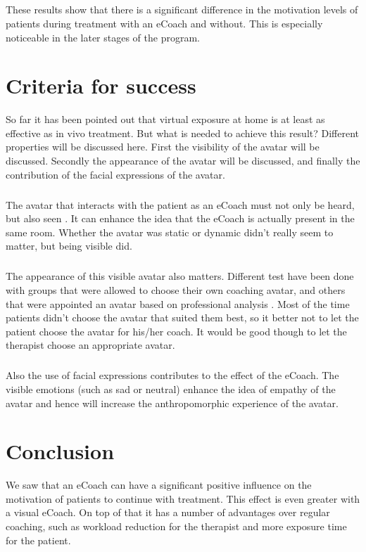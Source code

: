\documentclass[english,a4paper,pdftex]{report}
\begin{document}
\paragraph{}
These results show that there is a significant difference in the motivation levels of patients during treatment with an eCoach and without. This is especially noticeable in the later stages of the program.


\chapter{Criteria for success}
So far it has been pointed out that virtual exposure at home is at least as effective as in vivo treatment. But what is needed to achieve this result? Different properties will be discussed here. First the visibility of the avatar will be discussed. Secondly the appearance of the avatar will be discussed, and finally the contribution of the facial expressions of the avatar.
\paragraph{}
The avatar that interacts with the patient as an eCoach must not only be heard, but also seen \cite{baylor2009promoting}. It can enhance the idea that the eCoach is actually present in the same room. Whether the avatar was static or dynamic didn't really seem to matter, but being visible did.
\paragraph{}
The appearance of this visible avatar also matters. Different test have been done with groups that were allowed to choose their own coaching avatar, and others that were appointed an avatar based on professional analysis \cite{baylor2009promoting}. Most of the time patients didn't choose the avatar that suited them best, so it better not to let the patient choose the avatar for his/her coach. It would be good though to let the therapist choose an appropriate avatar.
\paragraph{}
Also the use of facial expressions contributes to the effect of the eCoach. The visible emotions (such as sad or neutral) enhance the idea of empathy of the avatar \cite{blanson2009online} and hence will increase the anthropomorphic experience of the avatar.


\chapter{Conclusion}
We saw that an eCoach can have a significant positive influence on the motivation of patients to continue with treatment. This effect is even greater with a visual eCoach. On top of that it has a number of advantages over regular coaching, such as workload reduction for the therapist and more exposure time for the patient.
\end{document}
